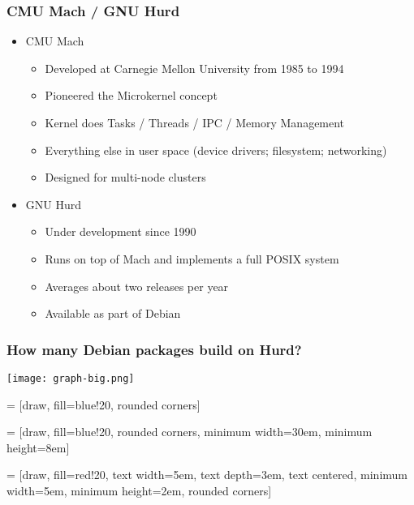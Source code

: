 \documentclass{beamer}
\begin{document}
\begin{frame}
\frametitle{CMU Mach / GNU Hurd}
\begin{itemize}
\item{CMU Mach}
\begin{itemize}
\item Developed at Carnegie Mellon University from 1985 to 1994
\item Pioneered the Microkernel concept
\item Kernel does Tasks / Threads / IPC / Memory Management
\item Everything else in user space (device drivers; filesystem; networking)
\item Designed for multi-node clusters
\end{itemize}
\item{GNU Hurd}
\begin{itemize}
\item Under development since 1990
\item Runs on top of Mach and implements a full POSIX system
\item Averages about two releases per year
\item Available as part of Debian
\end{itemize}
\end{itemize}
\end{frame}

\begin{frame}
\frametitle{How many Debian packages build on Hurd?}
\texttt{[image: graph-big.png]}
\end{frame}


 = [draw, fill=blue!20, rounded corners]

 = [draw, fill=blue!20, rounded corners, minimum width=30em, minimum height=8em]

 = [draw, fill=red!20, text width=5em, text depth=3em, text centered,
  minimum width=5em, minimum height=2em, rounded corners]

%
%
\end{document}
